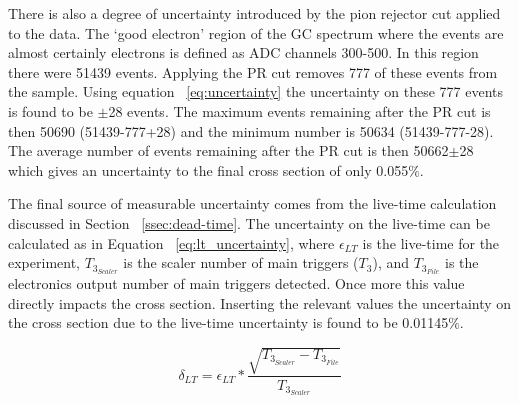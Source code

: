 There is also a degree of uncertainty introduced by the pion rejector cut applied to the data. The `good electron' region of the GC spectrum where the events are almost certainly electrons is defined as ADC channels 300-500. In this region there were 51439 events. Applying the PR cut removes 777 of these events from the sample. Using equation ~\ref{eq:uncertainty} the uncertainty on these 777 events is found to be $\pm$28 events. The maximum events remaining after the PR cut is then 50690 (51439-777+28) and the minimum number is 50634 (51439-777-28). The average number of events remaining after the PR cut is then 50662$\pm$28 which gives an uncertainty to the final cross section of only 0.055$\%$.

The final source of measurable uncertainty comes from the live-time calculation discussed in Section ~\ref{ssec:dead-time}. The uncertainty on the live-time can be calculated as in Equation ~\ref{eq:lt_uncertainty}, where $\epsilon_{LT}$ is the live-time for the experiment, $T_{3_{Scaler}}$ is the scaler number of main triggers ($T_3$), and $T_{3_{File}}$ is the electronics output number of main triggers detected. Once more this value directly impacts the cross section. Inserting the relevant values the uncertainty on the cross section due to the live-time uncertainty is found to be 0.01145$\%$.

\begin{equation} \label{eq:lt_uncertainty}
	\delta_{LT} = \epsilon_{LT} * \frac{\sqrt{T_{3_{Scaler}}-T_{3_{File}}}}{T_{3_{Scaler}}}
\end{equation}

